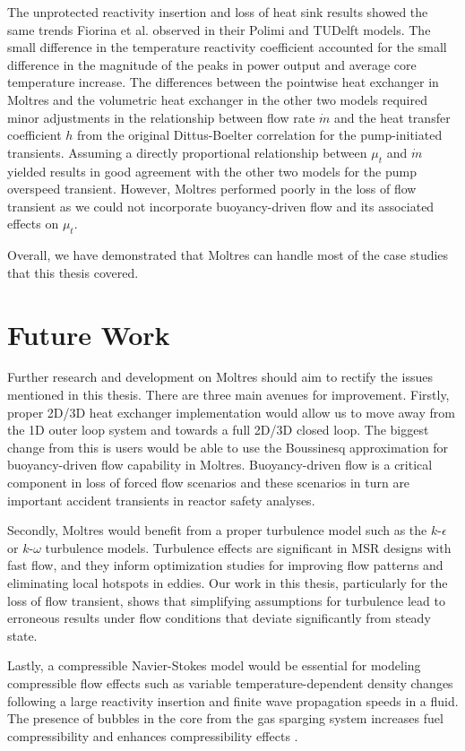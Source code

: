 The unprotected reactivity insertion and loss of heat sink results showed the
same trends Fiorina et al. observed in their Polimi and TUDelft models. The
small difference in the temperature reactivity coefficient accounted for the
small difference in the magnitude of the peaks in power output and average
core temperature increase. The differences between the pointwise heat
exchanger in Moltres and the volumetric heat exchanger in the other two
models required minor adjustments in the relationship between flow rate
$\dot{m}$ and the heat transfer coefficient $h$ from the original
Dittus-Boelter correlation for the pump-initiated transients. Assuming a
directly proportional relationship between $\mu_t$ and $\dot{m}$ yielded
results in good agreement with the other two models for the pump overspeed
transient. However, Moltres performed poorly in the loss of flow transient as
we could not incorporate buoyancy-driven flow and its associated effects on
$\mu_t$.

Overall, we have demonstrated that Moltres can handle most of the case
studies that this thesis covered.

\section{Future Work}

Further research and development on Moltres should aim to rectify the issues
mentioned in this thesis. There are three main avenues for improvement.
Firstly, proper 2D/3D heat exchanger implementation
would allow us to move away from the 1D outer loop system and towards a full
2D/3D closed loop. The biggest change from this is users would be able to use
the Boussinesq approximation for buoyancy-driven flow capability in Moltres.
Buoyancy-driven flow is a critical component in loss of forced flow scenarios
and these scenarios in turn are important accident transients in reactor
safety analyses.

Secondly, Moltres would benefit from a proper turbulence model such as the
$k$-$\epsilon$ or $k$-$\omega$ turbulence models. Turbulence effects are
significant in \gls{MSR} designs with fast flow, and they inform optimization
studies for improving flow patterns and eliminating local hotspots in eddies.
Our work in this thesis, particularly for the loss of flow transient, shows
that simplifying assumptions for turbulence lead to erroneous results under
flow conditions that deviate significantly from steady state.

Lastly, a compressible Navier-Stokes model would be essential for modeling
compressible flow effects such as variable temperature-dependent density
changes following a large reactivity insertion and finite wave propagation
speeds in a fluid. The presence of bubbles in the core from the gas sparging
system increases fuel compressibility and enhances compressibility effects
\cite{cervi_development_2019}. 
